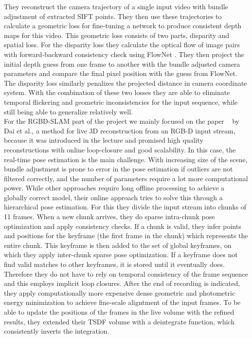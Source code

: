     They reconstruct the camera trajectory of a single input video with bundle adjustment of extracted SIFT points.
    They then use these trajectories to calculate a geometric loss for fine-tuning a network to produce consistent depth maps for this video.
    This geometric loss consists of two parts, disparity and spatial loss.
    For the disparity loss they calculate the optical flow of image pairs with forward-backward consistency check using FlowNet \cite{DFIB15}.
    They then project the initial depth guess from one frame to another with the bundle adjusted camera parameters and compare the final pixel position with the guess from FlowNet.
    The disparity loss similarly penalizes the projected distance in camera coordinate system.
    With the combination of these two losses they are able to eliminate temporal flickering and geometric inconsistencies for the input sequence, while still being able to generalize relatively well.\\
    \newpage
    For the RGBD-SLAM part of the project we mainly focused on the paper ~\cite{dai2017bundlefusion} by Dai et al., a method for live 3D reconstruction from an RGB-D input stream, because it was introduced in the lecture and promised high quality reconstructions with online loop-closure and good scalability.
    In this case, the real-time pose estimation is the main challenge.
    With increasing size of the scene, bundle adjustment is prone to error in the pose estimation if outliers are not filtered correctly, and the number of parameters require a lot more computational power.
    While other approaches require long offline processing to achieve a globally correct model, their online approach tries to solve this through a hierarchical pose estimation.
    For this they divide the input stream into chunks of 11 frames.
    When a new chunk arrives, they do sparse intra-chunk pose optimization and apply consistency checks.
    If a chunk is valid, they infer points and positions for the keyframe (the first frame in the chunk) which represents the entire chunk.
    This keyframe is then added to the set of global keyframes, on which they apply inter-chunk sparse pose optimization.
    If a keyframe does not find valid matches to other keyframes, it is stored until it eventually does.
    Therefore they do not have to rely on temporal consistency of the frame sequence and this employs implicit loop closures.
    After the end of recording is indicated, they apply computationally more expensive dense geometric and photometric energy minimization to achieve fine-scale aligntment of the input frames.
    To be able to update the positions of the frames in the live volume with the refined results, they extended their TSDF volume with a deintegrate function, which consistently inverts the integration.